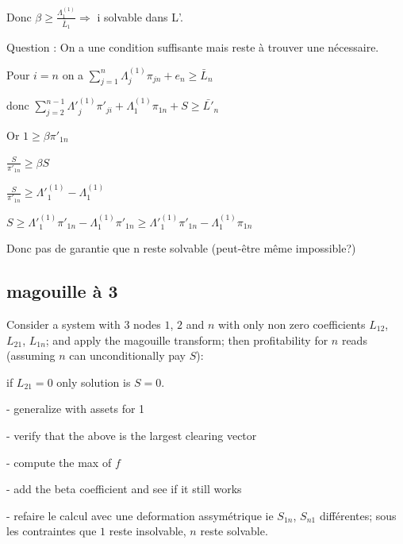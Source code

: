 \documentclass[11pt,oneside,twocolumn]{article}
\begin{document}
Donc $\beta \geq \frac{\Lambda^{(1)}_{1}}{\bar{L}_{1}} \Rightarrow$ i solvable dans L'.

Question : On a une condition suffisante mais reste à trouver une nécessaire.

\begin{center}
Pour $i = n$ on a $ \sum_{j=1}^{n} \Lambda^{(1)}_{j} \pi_{jn} + e_{n} \geq \bar{L}_{n}$

donc $ \sum_{j=2}^{n-1} \Lambda'^{(1)}_{j} \pi'_{ji} + \Lambda^{(1)}_{1} \pi_{1n} + S \geq \bar{L'}_{n}$
\end{center}

Or $1 \geq \beta \pi'_{1n}$

$\frac{S}{\pi'_{1n}} \geq \beta S$

$\frac{S}{\pi'_{1n}} \geq \Lambda'^{(1)}_{1} - \Lambda^{(1)}_{1}$

$S \geq \Lambda'^{(1)}_{1} \pi'_{1n} - \Lambda^{(1)}_{1} \pi'_{1n} \geq \Lambda'^{(1)}_{1} \pi'_{1n} - \Lambda^{(1)}_{1} \pi_{1n}$

Donc pas de garantie que n reste solvable (peut-être même impossible?)

\subsection{magouille à 3}
Consider a system with 3 nodes $1$, $2$ and $n$ with only non zero coefficients $L_{12}$, $L_{21}$, $L_{1n}$; and apply the magouille transform; then profitability for $n$ reads (assuming $n$ can unconditionally pay $S$):




if $L_{21}=0$ only solution is $S=0$.

- generalize with assets for 1

- verify that the above is the largest clearing vector

- compute the max of $f$

- add the beta coefficient and see if it still works

- refaire le calcul avec une deformation assymétrique ie $S_{1n}$, $S_{n1}$
différentes; sous les contraintes que $1$ reste insolvable, $n$ reste solvable.
\end{document}

